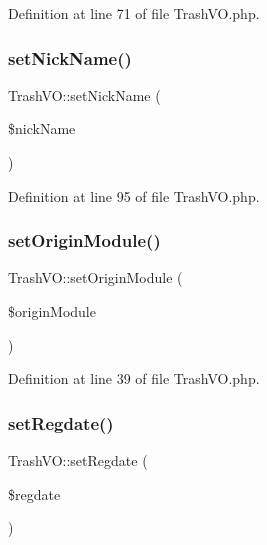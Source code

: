 Definition at line 71 of file Trash\+V\+O.\+php.

\hypertarget{classTrashVO_a27720ec735924373fea7f6aeea738892}{}\label{classTrashVO_a27720ec735924373fea7f6aeea738892} 
\subsubsection{\texorpdfstring{set\+Nick\+Name()}{setNickName()}}
{\footnotesize\ttfamily Trash\+V\+O\+::set\+Nick\+Name (\begin{DoxyParamCaption}\item[{}]{\$nick\+Name }\end{DoxyParamCaption})}



Definition at line 95 of file Trash\+V\+O.\+php.

\hypertarget{classTrashVO_a68e858c6a00999d0d3166af8c0df0d23}{}\label{classTrashVO_a68e858c6a00999d0d3166af8c0df0d23} 
\subsubsection{\texorpdfstring{set\+Origin\+Module()}{setOriginModule()}}
{\footnotesize\ttfamily Trash\+V\+O\+::set\+Origin\+Module (\begin{DoxyParamCaption}\item[{}]{\$origin\+Module }\end{DoxyParamCaption})}



Definition at line 39 of file Trash\+V\+O.\+php.

\hypertarget{classTrashVO_ac23c4bcbc9167b243f7f292190e35cb8}{}\label{classTrashVO_ac23c4bcbc9167b243f7f292190e35cb8} 
\subsubsection{\texorpdfstring{set\+Regdate()}{setRegdate()}}
{\footnotesize\ttfamily Trash\+V\+O\+::set\+Regdate (\begin{DoxyParamCaption}\item[{}]{\$regdate }\end{DoxyParamCaption})}



